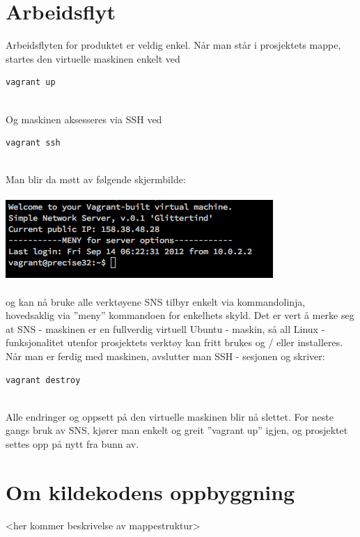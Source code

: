 \documentclass{article}
\begin{document}
\section{Arbeidsflyt}
Arbeidsflyten for produktet er veldig enkel. Når man står i prosjektets mappe, startes den virtuelle maskinen enkelt ved \\
\begin{lstlisting}
vagrant up
\end{lstlisting}
\\ 
Og maskinen aksesseres via SSH ved
\begin{lstlisting}
vagrant ssh
\end{lstlisting}
\\
Man blir da møtt av følgende skjermbilde: \\ \\
\includegraphics[scale = 0.7]{vagrantSSH.png}
\\ \\
og kan nå bruke alle verktøyene SNS tilbyr enkelt via kommandolinja, hovedsaklig via ''meny'' kommandoen for enkelhets skyld. Det er vert å merke seg at SNS - maskinen er en fullverdig virtuell Ubuntu - maskin, så all Linux - funksjonalitet utenfor prosjektets verktøy kan fritt brukes og / eller installeres. \\ 
Når man er ferdig med maskinen, avslutter man SSH - sesjonen og skriver: \\
\begin{lstlisting}
vagrant destroy
\end{lstlisting}
\\
Alle endringer og oppsett på den virtuelle maskinen blir nå slettet. For neste gangs bruk av SNS, kjører man enkelt og greit ''vagrant up'' igjen, og prosjektet settes opp på nytt fra bunn av. 
\section{Om kildekodens oppbyggning}
<her kommer beskrivelse av mappestruktur>
\end{document}
